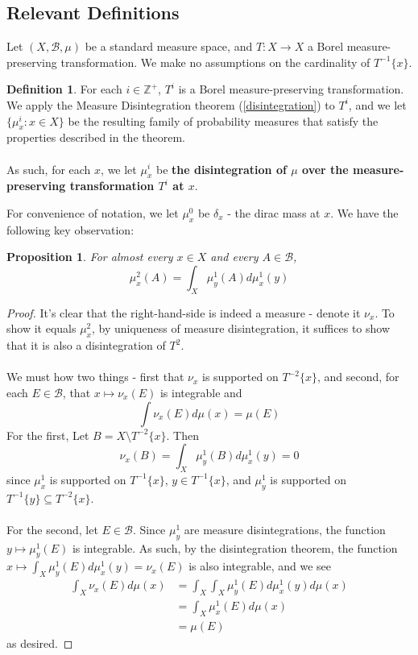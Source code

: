\documentclass{article}
\newcommand{\Zplus}{\mathbb{Z}^{+}}
\let\oldref\ref
\renewcommand{\ref}[1]{(\oldref{#1})}
\newtheorem{proposition}[theorem]{Proposition}
\theoremstyle{definition}
\newtheorem{definition}[theorem]{Definition}
\begin{document}
\subsection{Relevant Definitions}
Let $ (X,\mathcal{B},\mu) $ be a standard measure space, and $ T:X\rightarrow X $ a Borel measure-preserving transformation. We make no assumptions on the cardinality of $ T^{-1}\{x\} $.
\begin{definition}
    For each $ i\in \Zplus $, $ T^i $ is a Borel measure-preserving transformation. We apply the Measure Disintegration theorem \ref{disintegration} to $ T^i $, and we let $ \{\mu_x^i:x\in X\} $ be the resulting family of probability measures that satisfy the properties described in the theorem. \\\\
    As such, for each $ x $, we let $ \mu_x^i $ be \textbf{the disintegration of $ \mu $ over the measure-preserving transformation $ T^i $ at $ x $}.
\end{definition}
\noindent For convenience of notation, we let $ \mu^0_x $ be $ \delta_x $ - the dirac mass at $ x $. We have the following key observation:
\begin{proposition}
    For almost every $ x\in X $ and every $ A\in \mathcal{B} $, 
    \begin{equation}
        \label{eq:1}
    \mu^2_x (A) = \int_X \mu^1_y (A)d\mu^1_x(y)
    \end{equation}
\end{proposition}
\begin{proof}
    It's clear that the right-hand-side is indeed a measure - denote it $ \nu_x $. To show it equals $ \mu^2_x $, by uniqueness of measure disintegration, it suffices to show that it is also a disintegration of $ T^2 $.\\\\
    We must how two things - first that $ \nu_x $ is supported on $ T^{-2}\{x\} $, and second, for each $ E\in \mathcal{B} $, that $ x\mapsto \nu_x(E) $ is integrable and
    \[
    \int \nu_x(E) d\mu(x) = \mu(E)
    \]
    For the first, Let $ B = X\setminus T^{-2}\{x\} $. Then
    \[
    \nu_x(B) = \int_X \mu^1_y (B) d\mu^1_x (y) = 0
    \]
    since $ \mu^1_x $ is supported on $ T^{-1}\{x\} $, $ y\in T^{-1}\{x\} $, and $ \mu^1_y $ is supported on $ T^{-1}\{y\}\subseteq T^{-2}\{x\} $.\\\\
    For the second, let $ E\in \mathcal{B} $. Since $ \mu_y^1 $ are measure disintegrations, the function $ y\mapsto \mu_y^1(E) $ is integrable. As such, by the disintegration theorem, the function $ x\mapsto \int_X \mu_y^1(E)d\mu_x^1(y) = \nu_x(E) $ is also integrable, and we see
    \begin{align*}
        \int_X \nu_x(E)d\mu(x) &= \int_X \int_X \mu^1_y(E)d\mu^1_x(y)d\mu(x)\\
        &= \int_X\mu_x^1(E)d\mu(x)\\
        &= \mu(E)
    \end{align*}
    as desired.
\end{proof}
\end{document}
